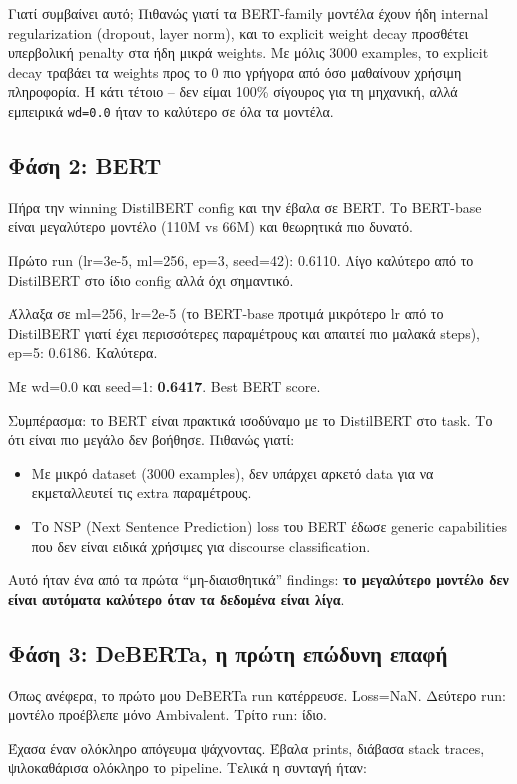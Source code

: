 \documentclass[12pt]{fphw}
\begin{document}
Γιατί συμβαίνει αυτό; Πιθανώς γιατί τα BERT-family μοντέλα έχουν ήδη internal regularization (dropout, layer norm), και το explicit weight decay προσθέτει υπερβολική penalty στα ήδη μικρά weights. Με μόλις 3000 examples, το explicit decay τραβάει τα weights προς το 0 πιο γρήγορα από όσο μαθαίνουν χρήσιμη πληροφορία. Ή κάτι τέτοιο -- δεν είμαι 100\% σίγουρος για τη μηχανική, αλλά εμπειρικά \texttt{wd=0.0} ήταν το καλύτερο σε όλα τα μοντέλα.

\subsection{Φάση 2: BERT}

Πήρα την winning DistilBERT config και την έβαλα σε BERT. Το BERT-base είναι μεγαλύτερο μοντέλο (110M vs 66M) και θεωρητικά πιο δυνατό.

Πρώτο run (lr=3e-5, ml=256, ep=3, seed=42): 0.6110. Λίγο καλύτερο από το DistilBERT στο ίδιο config αλλά όχι σημαντικό.

Άλλαξα σε ml=256, lr=2e-5 (το BERT-base προτιμά μικρότερο lr από το DistilBERT γιατί έχει περισσότερες παραμέτρους και απαιτεί πιο μαλακά steps), ep=5: 0.6186. Καλύτερα.

Με wd=0.0 και seed=1: \textbf{0.6417}. Best BERT score.

Συμπέρασμα: το BERT είναι πρακτικά ισοδύναμο με το DistilBERT στο task. Το ότι είναι πιο μεγάλο δεν βοήθησε. Πιθανώς γιατί:
\begin{itemize}
    \item Με μικρό dataset (3000 examples), δεν υπάρχει αρκετό data για να εκμεταλλευτεί τις extra παραμέτρους.
    \item Το NSP (Next Sentence Prediction) loss του BERT έδωσε generic capabilities που δεν είναι ειδικά χρήσιμες για discourse classification.
\end{itemize}

Αυτό ήταν ένα από τα πρώτα ``μη-διαισθητικά'' findings: \textbf{το μεγαλύτερο μοντέλο δεν είναι αυτόματα καλύτερο όταν τα δεδομένα είναι λίγα}.

\subsection{Φάση 3: DeBERTa, η πρώτη επώδυνη επαφή}

Όπως ανέφερα, το πρώτο μου DeBERTa run κατέρρευσε. Loss=NaN. Δεύτερο run: μοντέλο προέβλεπε μόνο Ambivalent. Τρίτο run: ίδιο.

Έχασα έναν ολόκληρο απόγευμα ψάχνοντας. Έβαλα prints, διάβασα stack traces, ψιλοκαθάρισα ολόκληρο το pipeline. Τελικά η συνταγή ήταν:
\end{document}
